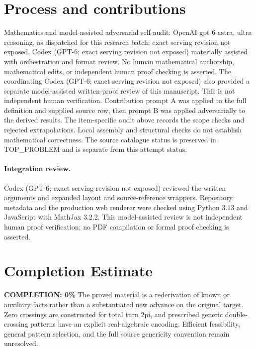 \documentclass[11pt]{article}
\begin{document}
\section{Process and contributions}
Mathematics and model-assisted adversarial self-audit: OpenAI gpt-6-astra, ultra reasoning, as dispatched for this research batch; exact serving revision not exposed. Codex (GPT-6; exact serving revision not exposed) materially assisted with orchestration and format review. No human mathematical authorship, mathematical edits, or independent human proof checking is asserted.
The coordinating Codex (GPT-6; exact serving revision not exposed) also provided a separate model-assisted written-proof review of this manuscript. This is not independent human verification.
Contribution prompt A was applied to the full definition and supplied source row, then prompt B was applied adversarially to the derived results. The item-specific audit above records the scope checks and rejected extrapolations. Local assembly and structural checks do not establish mathematical correctness. The source catalogue status is preserved in TOP\_PROBLEM and is separate from this attempt status.
\paragraph{Integration review.} Codex (GPT-6; exact serving revision not exposed) reviewed the written arguments and expanded layout and source-reference wrappers. Repository metadata and the production web renderer were checked using Python 3.13 and JavaScript with MathJax 3.2.2. This model-assisted review is not independent human proof verification; no PDF compilation or formal proof checking is asserted.

\section{Completion Estimate}
\noindent\textbf{COMPLETION: 0\%}
The proved material is a rederivation of known or auxiliary facts rather than a substantiated new advance on the original target. Zero crossings are constructed for total turn 2pi, and prescribed generic double-crossing patterns have an explicit real-algebraic encoding. Efficient feasibility, general pattern selection, and the full source genericity convention remain unresolved.
\end{document}
